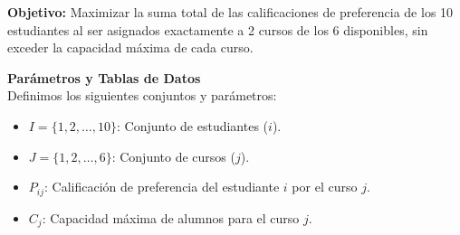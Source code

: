 \documentclass[10pt,a4paper]{article}
\begin{document}
\vspace{3mm}

\textbf{Objetivo:} Maximizar la suma total de las calificaciones de preferencia de los 10 estudiantes al ser asignados exactamente a 2 cursos de los 6 disponibles, sin exceder la capacidad máxima de cada curso.

\vspace{3mm}

\textbf{Parámetros y Tablas de Datos}\\
Definimos los siguientes conjuntos y parámetros:
\begin{itemize}
    \item $I = \{1, 2, \dots, 10\}$: Conjunto de estudiantes ($i$).
    \item $J = \{1, 2, \dots, 6\}$: Conjunto de cursos ($j$).
    \item $P_{ij}$: Calificación de preferencia del estudiante $i$ por el curso $j$.
    \item $C_j$: Capacidad máxima de alumnos para el curso $j$.
\end{itemize}
\end{document}

